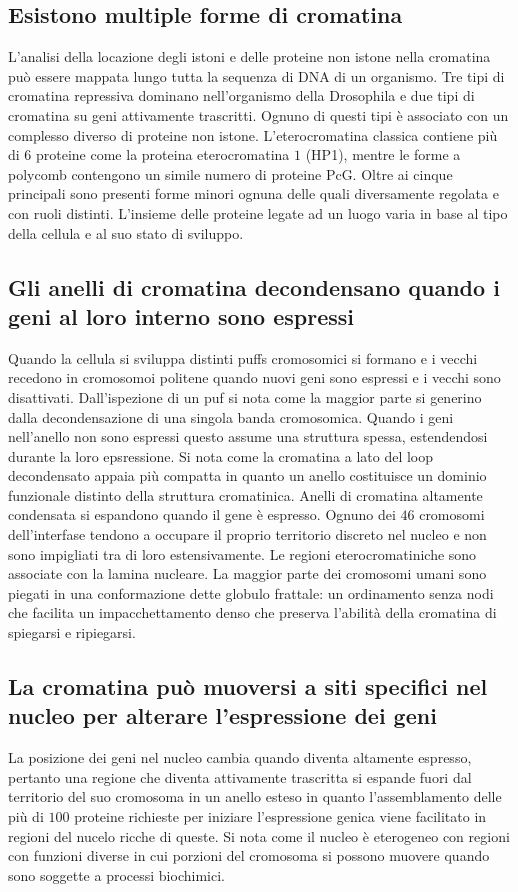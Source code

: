 \subsection{Esistono multiple forme di cromatina}
L'analisi della locazione degli istoni e delle proteine non istone nella cromatina pu\`o essere mappata lungo tutta la sequenza di DNA di un organismo. Tre tipi di cromatina repressiva
dominano nell'organismo della Drosophila e due tipi di cromatina su geni attivamente trascritti. Ognuno di questi tipi \`e associato con un complesso diverso di proteine non istone. 
L'eterocromatina classica contiene pi\`u di $6$ proteine come la proteina eterocromatina $1$ (HP1), mentre le forme a polycomb contengono un simile numero di proteine PcG. Oltre ai 
cinque principali sono presenti forme minori ognuna delle quali diversamente regolata e con ruoli distinti. L'insieme delle proteine legate ad un luogo varia in base al tipo della 
cellula e al suo stato di sviluppo.
\subsection{Gli anelli di cromatina decondensano quando i geni al loro interno sono espressi}
Quando la cellula si sviluppa distinti puffs cromosomici si formano e i vecchi recedono in cromosomoi politene quando nuovi geni sono espressi e i vecchi sono disattivati. Dall'ispezione
di un puf si nota come la maggior parte si generino dalla decondensazione di una singola banda cromosomica. Quando i geni nell'anello non sono espressi questo assume una struttura 
spessa, estendendosi durante la loro epsressione. Si nota come la cromatina a lato del loop decondensato appaia pi\`u compatta in quanto un anello costituisce un dominio funzionale
distinto della struttura cromatinica. Anelli di cromatina altamente condensata si espandono quando il gene \`e espresso. Ognuno dei $46$ cromosomi dell'interfase tendono a occupare il 
proprio territorio discreto nel nucleo e non sono impigliati tra di loro estensivamente. Le regioni eterocromatiniche sono associate con la lamina nucleare. La maggior parte dei 
cromosomi umani sono piegati in una conformazione dette globulo frattale: un ordinamento senza nodi che facilita un impacchettamento denso che preserva l'abilit\`a della cromatina di
spiegarsi e ripiegarsi.
\subsection{La cromatina pu\`o muoversi a siti specifici nel nucleo per alterare l'espressione dei geni}
La posizione dei geni nel nucleo cambia quando diventa altamente espresso, pertanto una regione che diventa attivamente trascritta si espande fuori dal territorio del suo cromosoma in
un anello esteso in quanto l'assemblamento delle pi\`u di $100$ proteine richieste per iniziare l'espressione genica viene facilitato in regioni del nucelo ricche di queste. Si nota come
il nucleo \`e eterogeneo con regioni con funzioni diverse in cui porzioni del cromosoma si possono muovere quando sono soggette a processi biochimici.

